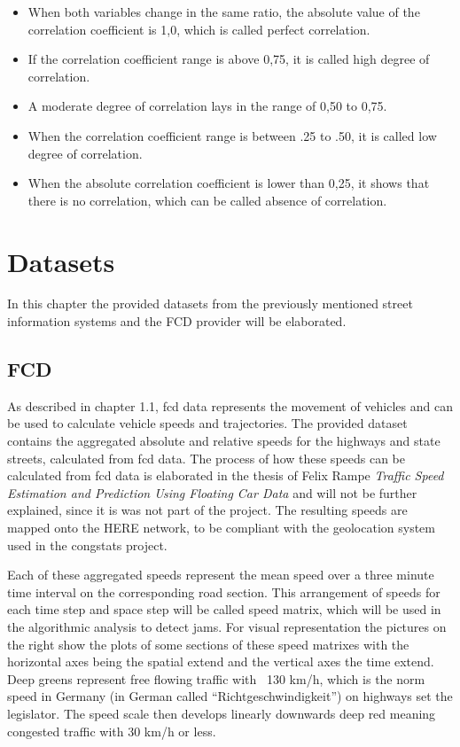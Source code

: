 \documentclass[a4paper,12pt]{report}
\begin{document}
\begin{itemize}
  \item When both variables change in the same ratio, the absolute value of the correlation coefficient is 1,0, which is called perfect correlation.
  \item If the correlation coefficient range is above 0,75, it is called high degree of correlation.
  \item A moderate degree of correlation lays in the range of 0,50 to 0,75.
  \item When the correlation coefficient range is between .25 to .50, it is called low degree of correlation.
  \item When the absolute correlation coefficient is lower than 0,25, it shows that there is no correlation, which can be called absence of correlation.
\end{itemize}	
	
\chapter{Datasets}
In this chapter the provided datasets from the previously mentioned street information systems and the FCD provider will be elaborated. 

\section{FCD}
\label{dataset_fcd}
\par As described in chapter 1.1, \acrshort{fcd} data represents the movement of vehicles and can be used to calculate vehicle speeds and trajectories. The provided dataset contains the aggregated absolute and relative speeds for the highways and state streets, calculated from \acrshort{fcd} data. The process of how these speeds can be calculated from \acrshort{fcd} data is elaborated in the thesis of Felix Rampe \textit{Traffic Speed Estimation and Prediction Using Floating Car Data} \cite{Rempe2018} and will not be further explained, since it is was not part of the project. The resulting speeds are mapped onto the HERE \cite{HERE2020} network, to be compliant with the geolocation system used in the \gls{congstats} project.
\par Each of these aggregated speeds represent the mean speed over a three minute time interval on the corresponding road section. This arrangement of speeds for each time step and space step will be called speed matrix, which will be used in the algorithmic analysis to detect jams. For visual representation the pictures on the right show the plots of some sections of these speed matrixes with the horizontal axes being the spatial extend and the vertical axes the time extend. Deep greens represent free flowing traffic with ~130 km/h, which is the norm speed in Germany (in German called “Richtgeschwindigkeit”) on highways set the legislator. The speed scale then develops linearly downwards deep red meaning congested traffic with 30 km/h or less. 
\end{document}
